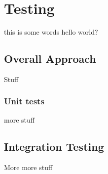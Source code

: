 \section{Testing}

this is some words
hello world?

\subsection{Overall Approach}
Stuff

\subsubsection{Unit tests}
more stuff

\subsection{Integration Testing}
More more stuff